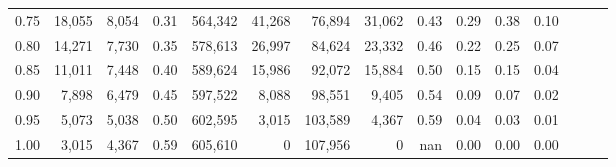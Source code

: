 \begin{tabular}{rrrrrrrrrrrrrrr}
0.75 &  18,055 &  8,054 &  0.31 &  564,342 &   41,268 &   76,894 &   31,062 &  0.43 &  0.29 &  0.38 &      0.10 \\
0.80 &  14,271 &  7,730 &  0.35 &  578,613 &   26,997 &   84,624 &   23,332 &  0.46 &  0.22 &  0.25 &      0.07 \\
0.85 &  11,011 &  7,448 &  0.40 &  589,624 &   15,986 &   92,072 &   15,884 &  0.50 &  0.15 &  0.15 &      0.04 \\
0.90 &   7,898 &  6,479 &  0.45 &  597,522 &    8,088 &   98,551 &    9,405 &  0.54 &  0.09 &  0.07 &      0.02 \\
0.95 &   5,073 &  5,038 &  0.50 &  602,595 &    3,015 &  103,589 &    4,367 &  0.59 &  0.04 &  0.03 &      0.01 \\
1.00 &   3,015 &  4,367 &  0.59 &  605,610 &        0 &  107,956 &        0 &   nan &  0.00 &  0.00 &      0.00 \\
\bottomrule
\end{tabular}
